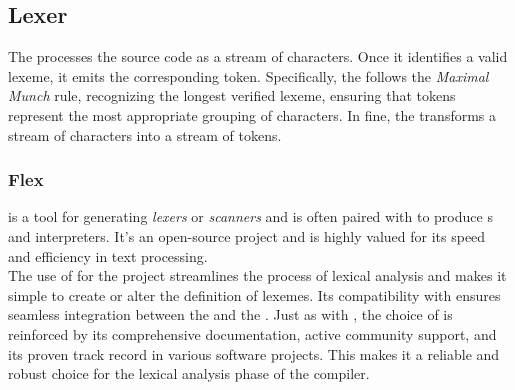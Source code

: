 \subsection{Lexer}

The \lexer{} processes the source code as a stream of characters. Once it identifies
a valid lexeme, it emits the corresponding token. Specifically, the \lexer{} follows
the \textit{Maximal Munch} rule, recognizing the longest verified lexeme, ensuring
that tokens represent the most appropriate grouping of characters. In fine, the
\lexer{} transforms a stream of characters into a stream of tokens.



\subsubsection{Flex}

\lexerGen{} is a tool for generating \textit{lexers} or \textit{scanners} and is
often paired with \parserGen{} to produce \parser{}s and interpreters. It's an
open-source project and is highly valued for its speed and efficiency in text
processing. \\

The use of \lexerGen{} for the \lang{} project streamlines the process of lexical
analysis and makes it simple to create or alter the definition of lexemes. Its
compatibility with \parserGen{} ensures seamless integration between the \lexer{} and
the \parser. Just as with \parserGen, the choice of \lexerGen{} is reinforced by its
comprehensive documentation, active community support, and its proven track record in
various software projects. This makes it a reliable and robust choice for the lexical
analysis phase of the \lang{} compiler.

